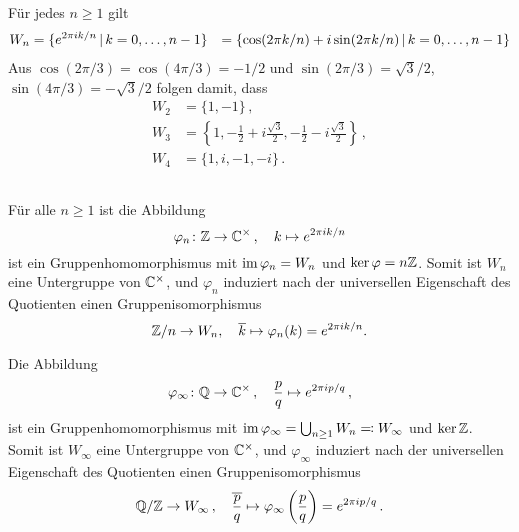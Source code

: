 \section{}





\subsection{}

Für jedes $n \geq 1$ gilt
\begin{align*}
    W_n
  &=  \{
        e^{2 \pi i  k / n}
      \suchthat
        k = 0, \dotsc, n-1
      \}
  &=  \{
        \cos(2 \pi k / n) + i \sin(2 \pi k /n )
      \suchthat
        k = 0, \dotsc, n-1
      \}
\end{align*}
Aus $\cos(2 \pi /3) = \cos(4 \pi / 3)  = -1/2$ und $\sin(2 \pi / 3) = \sqrt{3}/2$, $\sin(4 \pi /3) = -\sqrt{3}/2$ folgen damit, dass
\begin{align*}
  W_2 &= \{ 1, -1 \}\,, \\
  W_3 &= \left\{ 1, -\frac{1}{2} + i \frac{\sqrt{3}}{2}, -\frac{1}{2} - i \frac{\sqrt{3}}{2} \right\}\,, \\
  W_4 &= \{ 1, i, -1, -i \}\,.
\end{align*}





\subsection{}

Für alle $n \geq 1$ ist die Abbildung
\[
          \varphi_n
  \colon  \mathbb{Z}
  \to     \mathbb{C}^\times\,,
  \quad   k
  \mapsto e^{2 \pi i k / n}
\]
ist ein Gruppenhomomorphismus mit $\operatorname{im} \varphi_n = W_n$ und $\ker \varphi = n \mathbb{Z}$.
Somit ist $W_n$ eine Untergruppe von $\mathbb{C}^\times$, und $\varphi_n$ induziert nach der universellen Eigenschaft des Quotienten einen Gruppenisomorphismus
\[
          \mathbb{Z}/n
  \to     W_n,
  \quad   \overline{k}
  \mapsto \varphi_n(k)
  =       e^{2 \pi i k / n}.
\]

Die Abbildung
\[
          \varphi_\infty
  \colon  \mathbb{Q}
  \to     \mathbb{C}^\times\,,
  \quad   \frac{p}{q}
  \mapsto e^{2 \pi i p /q}\,,
\]
ist ein Gruppenhomomorphismus mit $\operatorname{im} \varphi_\infty = \bigcup_{n \geq 1} W_n \eqqcolon W_\infty$ und $\ker \mathbb{Z}$.
Somit ist $W_\infty$ eine Untergruppe von $\mathbb{C}^\times$, und $\varphi_\infty$ induziert nach der universellen Eigenschaft des Quotienten einen Gruppenisomorphismus
\[
          \mathbb{Q}/\mathbb{Z}
  \to     W_\infty\,,
  \quad   \overline{ \frac{p}{q} }
  \mapsto \varphi_\infty\left( \frac{p}{q} \right)
  =       e^{2 \pi i p /q}\,.
\]


